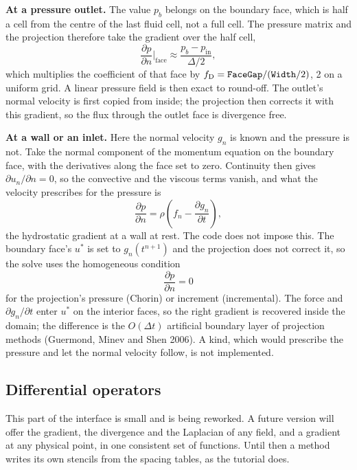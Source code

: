 \documentclass[10pt,a4paper]{article}
\newcommand{\code}[1]{\texttt{\detokenize{#1}}}
\begin{document}
\textbf{At a pressure outlet.} The value $p_b$ belongs on the boundary face, which is half a cell from the centre of
the last fluid cell, not a full cell. The pressure matrix and the projection therefore take the gradient over the
half cell,
\begin{equation*}
  \frac{\partial p}{\partial n}\bigg|_{\mathrm{face}} \approx \frac{p_b - p_{\mathrm{in}}}{\Delta/2},
\end{equation*}
which multiplies the coefficient of that face by $f_{\mathrm{D}} = \code{FaceGap}/(\code{Width}/2)$, 2 on a uniform
grid. A linear pressure field is then exact to round-off. The outlet's normal velocity is first copied from inside;
the projection then corrects it with this gradient, so the flux through the outlet face is divergence free.

\textbf{At a wall or an inlet.} Here the normal velocity $g_n$ is known and the pressure is not. Take the normal
component of the momentum equation on the boundary face, with the derivatives along the face set to zero. Continuity
then gives $\partial u_n/\partial n = 0$, so the convective and the viscous terms vanish, and what the velocity
prescribes for the pressure is
\begin{equation*}
  \frac{\partial p}{\partial n} = \rho\left(f_n - \frac{\partial g_n}{\partial t}\right),
\end{equation*}
the hydrostatic gradient at a wall at rest. The code does not impose this. The boundary face's $u^*$ is set to
$g_n(t^{n+1})$ and the projection does not correct it, so the solve uses the homogeneous condition
\begin{equation*}
  \frac{\partial p}{\partial n} = 0
\end{equation*}
for the projection's pressure (Chorin) or increment (incremental). The force and $\partial g_n/\partial t$ enter
$u^*$ on the interior faces, so the right gradient is recovered inside the domain; the difference is the $O(\Delta t)$
artificial boundary layer of projection methods (Guermond, Minev and Shen 2006). A \code{pressure_inlet} kind, which
would prescribe the pressure and let the normal velocity follow, is not implemented.

\subsection{Differential operators}

This part of the interface is small and is being reworked. A future version will offer the gradient, the divergence
and the Laplacian of any field, and a gradient at any physical point, in one consistent set of functions. Until then
a method writes its own stencils from the spacing tables, as the tutorial does.
\end{document}
